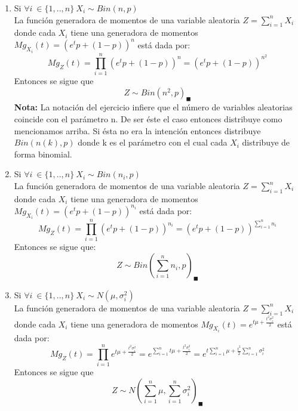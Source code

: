 \documentclass[11pt,a4paper]{report}
\begin{document}
\begin{enumerate}
{\begin{enumerate}
                \item{Si $\forall i \ \in \lbrace 1,..,n \rbrace \ X_{i} \sim Bin(n,p)$}\\
                La función generadora de momentos de una variable aleatoria $Z=\sum_{i=1}^{n}X_{i}$ donde cada $X_{i}$ tiene una generadora de momentos $Mg_{X_{i}}(t)=(e^t p+(1-p))^n$ está dada por:
                $$Mg_{Z}(t)=\prod_{i=1}^n (e^t p+(1-p))^n=(e^t p+(1-p))^{n^2}$$
                Entonces se sigue que 
                $$Z \sim Bin(n^2,p)_{\blacksquare}$$
                \textbf{Nota:} La notación del ejercicio infiere que el número de variables aleatorias coincide con el parámetro n. De ser éste el caso entonces distribuye como mencionamos arriba. Si ésta no era la intención entonces distribuye $Bin(n(k),p)$ donde k es el parámetro con el cual cada $X_{i}$ distribuye de forma binomial.
        
                \item{Si $\forall i \ \in \lbrace 1,..,n \rbrace \ X_{i} \sim Bin(n_{i},p)$ } \\
                La función generadora de momentos de una variable aleatoria $Z=\sum_{i=1}^{n}X_{i}$ donde cada $X_{i}$ tiene una generadora de momentos $Mg_{X_{i}}(t)=(e^t p+(1-p))^{n_{i}}$ está dada por:
                $$Mg_{Z}(t)=\prod_{i=1}^{n}(e^t p+(1-p))^{n_{i}}=(e^t p+(1-p))^{\sum_{i=1}^{n}n_{i}}$$
                Entonces se sigue que:
                $$Z\sim Bin(\sum_{i=1}^{n}n_{i},p)_{\blacksquare}$$
                \item{Si $\forall i \ \in \lbrace 1,..,n \rbrace \ X_{i} \sim N(\mu,\sigma_{i}^2)$ }\\
                La función generadora de momentos de una variable aleatoria $Z=\sum_{i=1}^{n}X_{i}$ donde cada $X_{i}$ tiene una generadora de momentos $Mg_{X_{i}}(t)=e^{t\mu +\frac{t^2 \sigma_{i} ^2}{2}}$ está dada por:
                $$Mg_{Z}(t)=\prod_{i=1}^{n} e^{t\mu +\frac{t^2 \sigma_{i} ^2}{2}}=e^{\sum_{i=1}^{n}t\mu + \frac{t^2 \sigma_{i} ^2}{2}}=e^{t\sum_{i=1}^{n}\mu+\frac{t^2}{2}\sum_{i=1}^{n}\sigma_{i} ^2}$$
                Entonces se sigue que 
                $$Z\sim N(\sum_{i=1}^{n}\mu,\sum_{i=1}^{n} \sigma_{i}^2)_{\blacksquare} $$
                
			\end{enumerate} 
		}


\end{enumerate}
\end{document}
